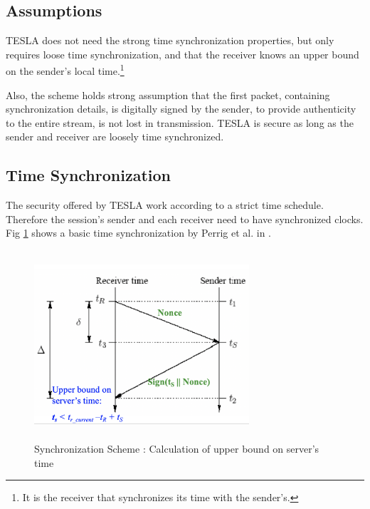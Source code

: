 \subsection{Assumptions}
TESLA does not need the strong time synchronization properties, but only requires loose time synchronization, and that the receiver knows an upper bound on the sender’s local time.\footnote{It is the receiver that synchronizes its time with the sender’s.}

Also, the scheme holds strong assumption that the first packet, containing synchronization details, is digitally signed by the sender, to provide authenticity to the entire stream, is not lost in transmission. TESLA is secure as long as the sender and receiver are loosely time synchronized. 



\subsection{Time Synchronization}  
\label{TimeSyncronization}
The security offered by TESLA work according to a strict time schedule. Therefore the session's sender and each receiver need to have synchronized clocks. Fig \ref{timeSync} shows a basic time synchronization by Perrig  et al. in \cite{perrig2002tesla}.

\begin{figure}[H]
    \centering
    \includegraphics[height=7cm,width=8cm]{figures/timeSync.png}
    \caption{Synchronization Scheme : Calculation of upper bound on server’s time}
    \label{timeSync}
\end{figure}

